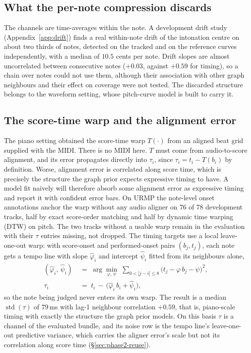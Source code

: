 \documentclass[11pt,a4paper]{report}
\begin{document}
\subsection{What the per-note compression discards}
The channels are time-averages within the note. A development drift study
(Appendix~\ref{app:drift}) finds a real within-note drift of the intonation
centre on about two thirds of notes, detected on the tracked and on the
reference curves independently, with a median of $10.5$ cents per note.
Drift slopes are almost uncorrelated between consecutive notes ($+0.03$,
against $+0.59$ for timing), so a chain over notes could not use them,
although their association with other graph neighbours and their effect on
coverage were not tested. The discarded structure belongs to the waveform
setting, whose pitch-curve model is built to carry it.

\subsection{The score-time warp and the alignment error}
The piano setting obtained the score-time warp $T(\cdot)$ from an aligned
beat grid supplied with the MIDI. There is no MIDI here. $T$ must come
from audio-to-score alignment, and its error propagates directly into
$\tau_i$, since $\tau_i = t_i - T(b_i)$ by definition. Worse, alignment
error is correlated along score time, which is precisely the structure
the graph prior expects expressive timing to have. A model fit naively
will therefore absorb some alignment error as expressive timing and
report it with confident error bars. On URMP the note-level onset
annotations anchor the warp without any audio aligner on
76 of 78 development tracks, half by exact score-order matching and half
by dynamic time warping (DTW) on pitch. The two tracks without a usable warp remain in the
evaluation with their $\tau$ entries missing, not dropped. The timing
targets use a local leave-one-out warp: with score-onset
and performed-onset pairs $(b_j, t_j)$, each note gets a tempo line with
slope $\hat\varphi_i$ and intercept $\hat\psi_i$ fitted from its
neighbours alone,
\begin{align}
  (\hat\varphi_i,\, \hat\psi_i)
  &\;=\; \arg\min_{\varphi,\,\psi}\; \sum_{0 < |j - i| \le 8}
     \bigl(t_j - \varphi\, b_j - \psi\bigr)^2,
  \label{eq:localwarp}\\
  \tau_i &\;=\; t_i \,-\, \bigl(\hat\varphi_i\, b_i + \hat\psi_i\bigr),
  \nonumber
\end{align}
so the note being judged never enters its own warp. The result is a
median $\operatorname{std}(\tau)$ of $79$\,ms with lag-1 neighbour
correlation $+0.59$, that is, piano-scale timing with exactly the
structure the graph prior models. On this basis $\tau$ is a channel of
the evaluated bundle, and its noise row is the tempo line's leave-one-out
predictive variance, which carries the aligner error's scale but not its
correlation along score time (\S\ref{sec:phase2-reuse}).
\end{document}
